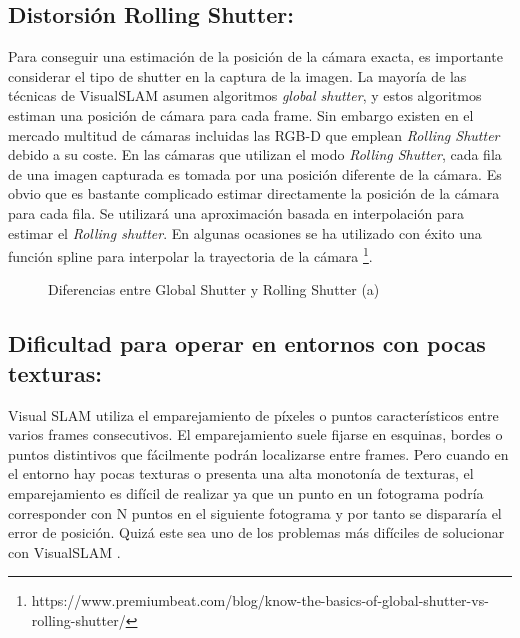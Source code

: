 \subsection{Distorsión Rolling Shutter:}

Para conseguir una estimación de la posición de la cámara exacta, es importante considerar el tipo de shutter en la captura de la imagen. La mayoría de las técnicas de VisualSLAM asumen algoritmos \textit {global shutter}, y estos algoritmos estiman una posición de cámara para cada frame. Sin embargo existen en el mercado multitud de cámaras incluidas las RGB-D que emplean \textit {Rolling Shutter} debido a su coste. En las cámaras que utilizan el modo \textit{Rolling Shutter}, cada fila de una imagen capturada es tomada por una posición diferente de la cámara. Es obvio que es bastante complicado estimar directamente la posición de la cámara para cada fila. Se utilizará una aproximación basada en interpolación para estimar el \textit{Rolling shutter}. En algunas ocasiones se ha utilizado con éxito una función spline para interpolar la trayectoria de la cámara \footnote{https://www.premiumbeat.com/blog/know-the-basics-of-global-shutter-vs-rolling-shutter/}.

\begin{figure}[htbp]
\begin{center}
\end{center}
\caption{Diferencias entre Global Shutter y Rolling Shutter (a)}
\end{figure}


\subsection{Dificultad para operar en entornos con pocas texturas:}

Visual SLAM utiliza el emparejamiento de píxeles o puntos característicos entre varios frames consecutivos. El emparejamiento suele fijarse en esquinas, bordes  o puntos distintivos que fácilmente podrán localizarse entre frames. Pero cuando en el entorno hay pocas texturas o presenta una alta monotonía de texturas,  el emparejamiento es difícil de realizar ya que un punto en un fotograma podría corresponder con N puntos en el siguiente fotograma y por tanto se dispararía el error de posición. Quizá este sea uno de los problemas más difíciles de solucionar con VisualSLAM
\cite{Takafumi17}.

